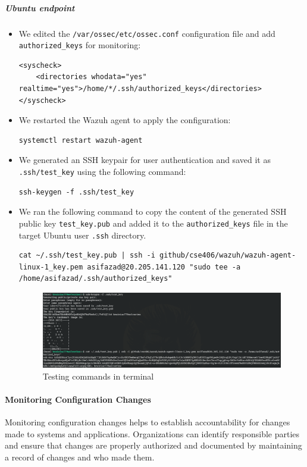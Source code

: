 \subparagraph{Ubuntu endpoint}
\begin{itemize}
    \item We edited the \texttt{/var/ossec/etc/ossec.conf} configuration file and add \texttt{authorized\_keys} for monitoring:
    \begin{verbatim}
<syscheck>
    <directories whodata="yes" realtime="yes">/home/*/.ssh/authorized_keys</directories>
</syscheck>
    \end{verbatim}

    \item  We restarted the Wazuh agent to apply the configuration:
          \begin{verbatim}
systemctl restart wazuh-agent
            \end{verbatim}
    \item We generated an SSH key\-pair for user authentication and saved it as \texttt{.ssh/test\_key} using the following command:
          \begin{verbatim}
ssh-keygen -f .ssh/test_key
            \end{verbatim}
    \item We ran the following command to copy the content of the generated SSH public key \texttt{test\_key.pub} and added it to the \texttt{authorized\_keys} file in the target Ubuntu user \texttt{.ssh} directory.
          \begin{verbatim}
cat ~/.ssh/test_key.pub | ssh -i github/cse406/wazuh/wazuh-agent-linux-1_key.pem asifazad@20.205.141.120 "sudo tee -a /home/asifazad/.ssh/authorized_keys"
            \end{verbatim}
          \begin{figure} [H]
              \centering
              \includegraphics[width=\textwidth]{images/fim/fim-2.png}
              \caption{Testing commands in terminal}
              \label{fig:fim-2}
          \end{figure}

\end{itemize}


\paragraph{Monitoring Configuration Changes}
Monitoring configuration changes helps to establish accountability for changes made to systems and applications. Organizations can identify responsible parties and ensure that changes are properly authorized and documented by maintaining a record of changes and who made them.

